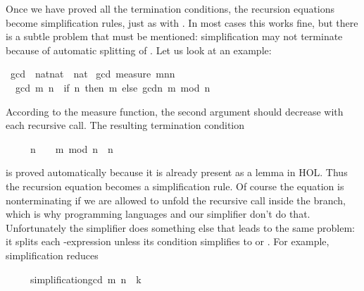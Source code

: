 %
\begin{isabellebody}%
\def\isabellecontext{simplification}%
%
\isadelimtheory
%
\endisadelimtheory
%
\isatagtheory
\isamarkupfalse%
%
\endisatagtheory
{\isafoldtheory}%
%
\isadelimtheory
%
\endisadelimtheory
%
\begin{isamarkuptext}%
Once we have proved all the termination conditions, the  
recursion equations become simplification rules, just as with
. In most cases this works fine, but there is a subtle
problem that must be mentioned: simplification may not
terminate because of automatic splitting of .
Let us look at an example:%
\end{isamarkuptext}%
\isamarkuptrue%
\isamarkupfalse%
\ gcd\ {\isacharcolon}{\isacharcolon}\ {\isachardoublequoteopen}nat{\isasymtimes}nat\ {\isasymRightarrow}\ nat{\isachardoublequoteclose}\isanewline
{}\isamarkupfalse%
\ gcd\ {\isachardoublequoteopen}measure\ {\isacharparenleft}{\isasymlambda}{\isacharparenleft}m{\isacharcomma}n{\isacharparenright}{\isachardot}n{\isacharparenright}{\isachardoublequoteclose}\isanewline
\ \ {\isachardoublequoteopen}gcd\ {\isacharparenleft}m{\isacharcomma}\ n{\isacharparenright}\ {\isacharequal}\ {\isacharparenleft}if\ n{\isacharequal}{}\ then\ m\ else\ gcd{\isacharparenleft}n{\isacharcomma}\ m\ mod\ n{\isacharparenright}{\isacharparenright}{\isachardoublequoteclose}%
\begin{isamarkuptext}%
\noindent
According to the measure function, the second argument should decrease with
each recursive call. The resulting termination condition
\begin{isabelle}%
\ \ \ \ \ n\ {\isasymnoteq}\ {}\ {\isasymLongrightarrow}\ m\ mod\ n\ {\isacharless}\ n%
\end{isabelle}
is proved automatically because it is already present as a lemma in
HOL\@.  Thus the recursion equation becomes a simplification
rule. Of course the equation is nonterminating if we are allowed to unfold
the recursive call inside the  branch, which is why programming
languages and our simplifier don't do that. Unfortunately the simplifier does
something else that leads to the same problem: it splits 
each -expression unless its
condition simplifies to  or .  For
example, simplification reduces
\begin{isabelle}%
\ \ \ \ \ simplification{\isachardot}gcd\ {\isacharparenleft}m{\isacharcomma}\ n{\isacharparenright}\ {\isacharequal}\ k%

\end{isabelle}
\end{isamarkuptext}
\end{isabellebody}
